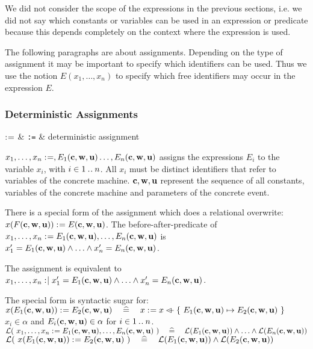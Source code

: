 We did not consider the scope of the expressions in the previous sections, i.e. we did not say which constants or variables can be used in an expression or predicate because
this depends completely on the context where the expression is used.

The following paragraphs are about assignments. Depending on the type of assignment it
may be important to specify which identifiers can be used.
Thus we use the notion $E(x_1,\ldots,x_n)$ to specify which free identifiers may occur
in the expression $E$.

\newcommand{\eventbassignmentexpr}[1]{E_{#1}(\allconstants,\concvariables,\concparameters)}

\subsubsection{Deterministic Assignments}
\label{deterministic_assignments}
\begin{rrnames}
  $\mathrel{:\mkern1mu=}$ & \texttt{:=} & deterministic assignment
\end{rrnames}
\begin{rodinrefentry}
  \rrdesc
    $x_1,\ldots,x_n \bcmeq ,\eventbassignmentexpr{1}\ldots,\eventbassignmentexpr{n}$
    assigns the expressions $E_i$ to the variable $x_i$, with $i\in1\mathbin{.\mkern1mu.} n$.
    All $x_i$ must be distinct identifiers that refer to variables of the concrete machine.
    $\mathbf{c},\mathbf{w},\mathbf{u}$ represent the sequence of all constants, 
    variables of the concrete machine and parameters of the concrete event.

    There is a special form of the assignment which does a relational overwrite:\\
    $x(F(\mathbf{c},\mathbf{w},\mathbf{u})) \mathrel{:\mkern1mu=} E(\mathbf{c},\mathbf{w},\mathbf{u})$.
  \rrdef
    The before-after-predicate of $x_1,\ldots,x_n \bcmeq \eventbassignmentexpr{1},\ldots,\eventbassignmentexpr{n}$ is\\ $x_1' = \eventbassignmentexpr{1} \land \ldots \land x_n' = \eventbassignmentexpr{n}$.

    The assignment is equivalent to
    $x_1,\ldots,x_n \bcmsuch x_1' = \eventbassignmentexpr{1} \land \ldots \land x_n' = \eventbassignmentexpr{n}$.

    The special form is syntactic sugar for:\\
    $x(\eventbassignmentexpr{1}) \bcmeq \eventbassignmentexpr{2}
      \quad\defi\quad 
      x \bcmeq x \ovl \{~\eventbassignmentexpr{1} \mapsto \eventbassignmentexpr{2}~\}$
  \rrtypes
    $x_i\in\alpha$ and  $\eventbassignmentexpr{i}\in\alpha$ for $i \in 1\mathbin{.\mkern1mu.} n$.
  \rrwd
    $\wdl(~x_1,\ldots,x_n \bcmeq \eventbassignmentexpr{1},\ldots,\eventbassignmentexpr{n}~)
      \quad\defi\quad 
      \wdl(\eventbassignmentexpr{1}) \land \ldots \land \wdl(\eventbassignmentexpr{n})$ \\
    $\wdl(~x(\eventbassignmentexpr{1}) \bcmeq \eventbassignmentexpr{2}~)
    \quad\defi\quad 
    \wdl(\eventbassignmentexpr{1}) \land \wdl(\eventbassignmentexpr{2})$
\end{rodinrefentry}

